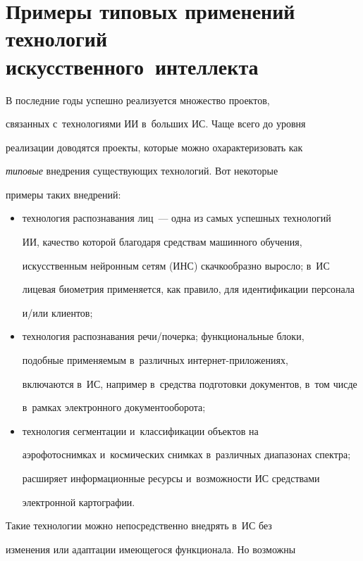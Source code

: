 \section{Примеры типовых применений технологий искусственного~интеллекта}



     В последние годы успешно реализуется множество проектов, 

связанных с~технологиями ИИ в~больших ИС. Чаще всего до уровня 

реализации доводятся проекты, которые можно охарактеризовать как 

\textit{типовые} внедрения су\-щест\-ву\-ющих технологий. Вот некоторые 

примеры таких внедрений:

     \begin{itemize}

\item технология распознавания лиц~--- одна из самых успешных технологий 

ИИ, качество которой благодаря средствам машинного обучения, 

искусственным нейронным сетям (ИНС) скачкообразно выросло; в~ИС 

лицевая биометрия применяется, как правило, для идентификации персонала 

и\!/\!или клиентов;

\item технология распознавания ре\-чи\!/\!по\-чер\-ка; функциональные блоки, 

подобные применяемым в~различных ин\-тер\-нет-при\-ло\-же\-ни\-ях, 

включаются в~ИС, например в~средства подготовки документов, в~том чисде 

в~рамках электронного документооборота;

\item технология сегментации и~классификации объектов на 

аэрофотоснимках и~космических снимках в~различных диапазонах спектра; 

расширяет информационные ресурсы и~возможности ИС средствами 

электронной картографии.

\end{itemize}

     

     Такие технологии можно непосредственно внедрять в~ИС без 

изменения или адаптации имеющегося функционала. Но возможны 

